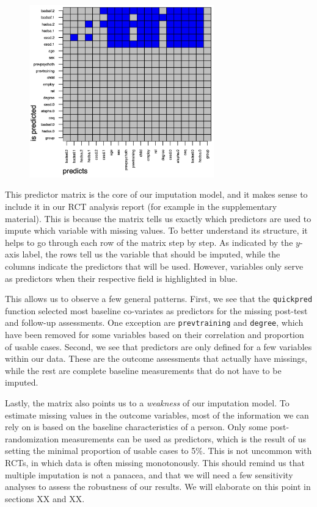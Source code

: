 \begin{figure}[H]
\includegraphics[width=8cm]{images/impmat.png}
\centering
\end{figure}

This predictor matrix is the core of our imputation model, and it makes sense to include it in our RCT analysis report (for example in the supplementary material). This is because the matrix tells us exactly which predictors are used to impute which variable with missing values. To better understand its structure, it helps to go through each row of the matrix step by step. As indicated by the $y$-axis label, the rows tell us the variable that should be imputed, while the columns indicate the predictors that will be used. However, variables only serve as predictors when their respective field is highlighted in blue. 

This allows us to observe a few general patterns. First, we see that the \texttt{quickpred} function selected most baseline co-variates as predictors for the missing post-test and follow-up assessments. One exception are \texttt{prevtraining} and \texttt{degree}, which have been removed for some variables based on their correlation and proportion of usable cases. Second, we see that predictors are only defined for a few variables within our data. These are the outcome assessments that actually have missings, while the rest are complete baseline measurements that do not have to be imputed. 

Lastly, the matrix also points us to a \emph{weakness} of our imputation model. To estimate missing values in the outcome variables, most of the information we can rely on is based on the baseline characteristics of a person. Only some post-randomization measurements can be used as predictors, which is the result of us setting the minimal proportion of usable cases to 5\%. This is not uncommon with RCTs, in which data is often missing monotonously. This should remind us that multiple imputation is not a panacea, and that we will need a few sensitivity analyses to assess the robustness of our results. We will elaborate on this point in sections XX and XX. 

